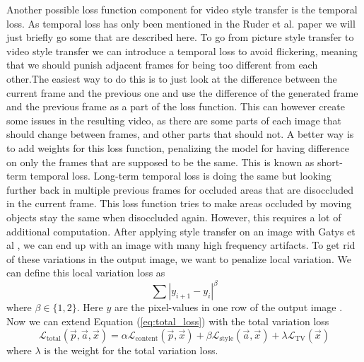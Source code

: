 Another possible loss function component for video style transfer is the temporal loss. As temporal loss has only been mentioned in the Ruder et al. \cite{Ruder:1} paper we will just briefly go some that are described here. To go from picture style transfer to video style transfer we can introduce a temporal loss to avoid flickering, meaning that we should punish adjacent frames for being too different from each other.The easiest way to do this is to just look at the difference between the current frame and the previous one and use the difference of the generated frame and the previous frame as a part of the loss function. This can however create some issues in the resulting video, as there are some parts of each image that should change between frames, and other parts that should not. A better way is to add weights for this loss function, penalizing the model for having difference on only the frames that are supposed to be the same. This is known as short-term temporal loss. Long-term temporal loss is doing the same but looking further back in multiple previous frames for occluded areas that are disoccluded in the current frame. This loss function tries to make areas occluded by moving objects stay the same when disoccluded again. However, this requires a lot of additional computation. 
\newline\newline
After applying style transfer on an image with Gatys et al \cite{Gatys:1}, we can end up with an image with many high frequency artifacts. To get rid of these variations in the output image, we want to penalize local variation. We can define this local variation loss as
\begin{equation}
    \sum{|y_{i+1}-y_i|^\beta}
\end{equation}
where $\beta\in\{1,2\}.$ Here $y$ are the pixel-values in one row of the output image \cite{Zhaoyou:1}. Now we can extend Equation (\ref{eq:total_loss}) with the total variation loss
\begin{equation}
    \mathcal{L}_\text{total}(\vec{p}, \vec{a}, \vec{x})=\alpha\mathcal{L}_\text{content}(\vec{p},\vec{x})+\beta\mathcal{L}_\text{style}(\vec{a},\vec{x})+\lambda\mathcal{L}_\text{TV}(\vec{x})
\end{equation}
where $\lambda$ is the weight for the total variation loss.
\newpage